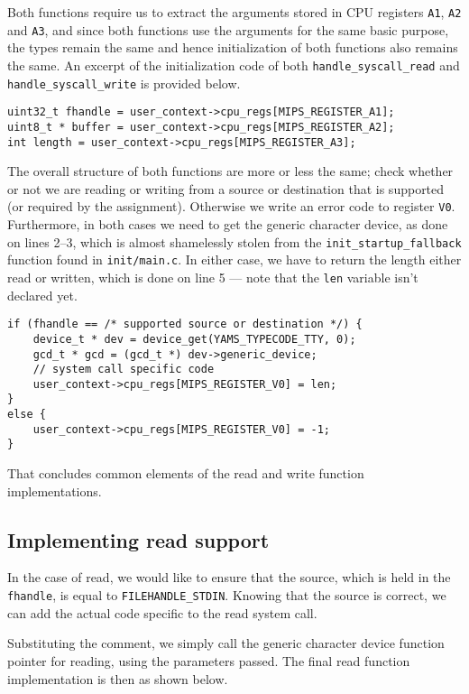\documentclass[11pt]{article}
\newcommand{\code}[1]{{\tt #1}}
\newcommand{\file}[1]{{\tt #1}}
\begin{document}
Both functions require us to extract the arguments stored in CPU registers
\code{A1}, \code{A2} and \code{A3}, and since both functions use the arguments
for the same basic purpose, the types remain the same and hence initialization
of both functions also remains the same. An excerpt of the initialization code
of both \code{handle\_syscall\_read} and \code{handle\_syscall\_write} is
provided below.

\begin{lstlisting}
uint32_t fhandle = user_context->cpu_regs[MIPS_REGISTER_A1];
uint8_t * buffer = user_context->cpu_regs[MIPS_REGISTER_A2];
int length = user_context->cpu_regs[MIPS_REGISTER_A3];
\end{lstlisting}

The overall structure of both functions are more or less the same; check
whether or not we are reading or writing from a source or destination that is
supported (or required by the assignment). Otherwise we write an error code to
register \code{V0}. Furthermore, in both cases we need to get the generic
character device, as done on lines 2--3, which is almost shamelessly stolen
from the \code{init\_startup\_fallback} function found in \file{init/main.c}.
In either case, we have to return the length either read or written, which is
done on line 5 --- note that the \code{len} variable isn't declared yet.

\begin{lstlisting}
if (fhandle == /* supported source or destination */) {
    device_t * dev = device_get(YAMS_TYPECODE_TTY, 0);
    gcd_t * gcd = (gcd_t *) dev->generic_device;
    // system call specific code
    user_context->cpu_regs[MIPS_REGISTER_V0] = len;
}
else {
    user_context->cpu_regs[MIPS_REGISTER_V0] = -1;
}
\end{lstlisting}

That concludes common elements of the read and write function implementations.

\subsection{Implementing read support}
In the case of read, we would like to ensure that the source, which is held
in the \code{fhandle}, is equal to \code{FILEHANDLE\_STDIN}. Knowing that the
source is correct, we can add the actual code specific to the read system
call.

Substituting the comment, we simply call the generic character device function
pointer for reading, using the parameters passed. The final read function
implementation is then as shown below.
\end{document}
